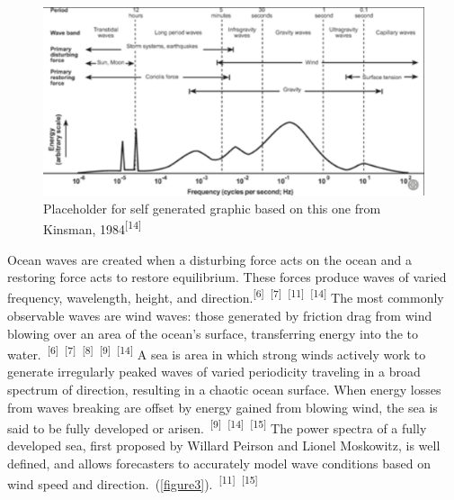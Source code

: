 \documentclass{article}
\begin{document}

\begin{figure} 
    \centering
    \includegraphics[width=1\linewidth]{images/ocean-wave-energy-schematic.png}
    \caption{Placeholder for self generated graphic based on this one from Kinsman, 1984\textsuperscript{[14]}}
    \label{figure2}
\end{figure}



\par{\hspace{.5cm}Ocean waves are created when a disturbing force acts on the ocean and a restoring force acts to restore equilibrium. These forces produce waves of varied frequency, wavelength, height, and direction.\textsuperscript{[6]}~\textsuperscript{[7]}~\textsuperscript{[11]}~\textsuperscript{[14]} The most commonly observable waves are wind waves: those generated by friction drag from wind blowing over an area of the ocean's surface, transferring energy into the to water.~\textsuperscript{[6]}~\textsuperscript{[7]}~\textsuperscript{[8]}~\textsuperscript{[9]}~\textsuperscript{[14]} A sea is area in which strong winds actively work to generate irregularly peaked waves of varied periodicity traveling in a broad spectrum of direction, resulting in a chaotic ocean surface. When energy losses from waves breaking are offset by energy gained from blowing wind, the sea is said to be fully developed or arisen.~\textsuperscript{[9]}~\textsuperscript{[14]}~\textsuperscript{[15]} The power spectra of a fully developed sea, first proposed by Willard Peirson and Lionel Moskowitz, is well defined, and allows forecasters to accurately model wave conditions based on wind speed and direction.~(\cref{figure3}).~\textsuperscript{[11]}~\textsuperscript{[15]}}


\end{document}
